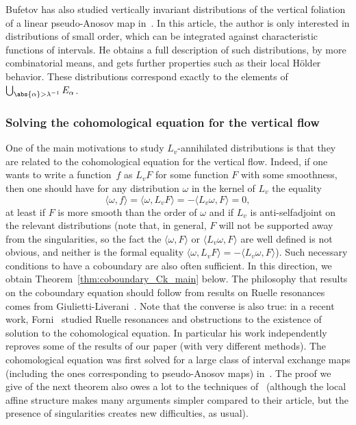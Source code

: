 \documentclass[JEP,XML,SOM,Unicode]{cedram}
\theoremstyle{definition}
\numberwithin{equation}{section}
\begin{document}
Bufetov has also studied vertically invariant distributions of the vertical
foliation of a linear pseudo-Anosov map in~\cite{bufetov_pseudo_anosov}. In
this article, the author is only interested in distributions of small order,
which can be integrated against characteristic functions of intervals. He
obtains a full description of such distributions, by more combinatorial
means, and gets further properties such as their local Hölder behavior. These
distributions correspond exactly to the elements of
$\bigcup_{\abs{\alpha}>\lambda^{-1}} E_\alpha$.

\subsubsection*{Solving the cohomological equation for the vertical flow}

One of the main motivations to study $L_v$-annihilated distributions is that
they are related to the cohomological equation for the vertical flow. Indeed,
if one wants to write a function~$f$ as $L_v F$ for some function $F$ with
some smoothness, then one should have for any distribution $\omega$ in the
kernel of $L_v$ the equality
\begin{equation}
\label{eq:woixcuyvjklmlsw<cmviw}
\langle \omega, f \rangle = \langle \omega, L_v F \rangle
= -\langle L_v \omega, F\rangle
= 0,
\end{equation}
at least if $F$ is more smooth than the order of $\omega$ and if $L_v$ is
anti-selfadjoint on the relevant distributions (note that, in general, $F$
will not be supported away from the singularities, so the fact the $\langle
\omega, F\rangle$ or $\langle L_v \omega, F\rangle$ are well defined is not
obvious, and neither is the formal equality $\langle \omega, L_v F \rangle
= -\langle L_v \omega, F\rangle$). Such necessary conditions to
have a coboundary are also often sufficient. In this direction, we obtain
Theorem~\ref{thm:coboundary_Ck_main} below. The philosophy that results on
the coboundary equation should follow from results on Ruelle resonances comes
from Giulietti-Liverani~\cite{giulietti_liverani}. Note that the converse is
also true: in a recent work, Forni~\cite{forni2018} studied Ruelle resonances
and obstructions to the existence of solution to the cohomological equation.
In particular his work independently reproves some of the results of our
paper (with very different methods). The cohomological equation was first
solved for a large class of interval exchange maps (including the ones
corresponding to pseudo-Anosov maps) in~\cite{marmi_moussa_yoccoz}. The proof
we give of the next theorem also owes a lot to the techniques
of~\cite{giulietti_liverani} (although the local affine structure makes many
arguments simpler compared to their article, but the presence of
singularities creates new difficulties, as usual).
\end{document}
